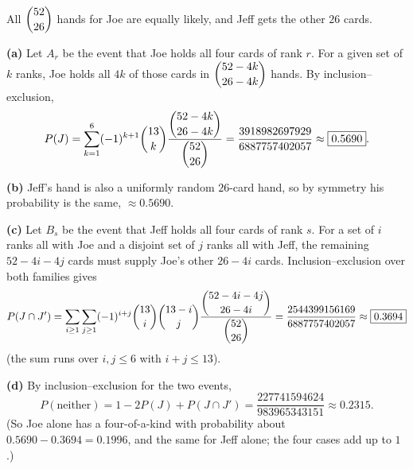 All $\dbinom{52}{26}$ hands for Joe are equally likely, and Jeff gets the other $26$ cards.

\textbf{(a)} Let $A_r$ be the event that Joe holds all four cards of rank $r$. For a given set of $k$ ranks, Joe holds all $4k$ of those cards in $\dbinom{52-4k}{26-4k}$ hands. By inclusion--exclusion,
\[
P(J)=\sum_{k=1}^{6}(-1)^{k+1}\dbinom{13}{k}\dfrac{\dbinom{52-4k}{26-4k}}{\dbinom{52}{26}}=\dfrac{3918982697929}{6887757402057}\approx\boxed{0.5690}.
\]

\textbf{(b)} Jeff's hand is also a uniformly random $26$-card hand, so by symmetry his probability is the same, $\boxed{\approx0.5690}$.

\textbf{(c)} Let $B_s$ be the event that Jeff holds all four cards of rank $s$. For a set of $i$ ranks all with Joe and a disjoint set of $j$ ranks all with Jeff, the remaining $52-4i-4j$ cards must supply Joe's other $26-4i$ cards. Inclusion--exclusion over both families gives
\[
P(J\cap J')=\sum_{i\ge1}\sum_{j\ge1}(-1)^{i+j}\dbinom{13}{i}\dbinom{13-i}{j}\dfrac{\dbinom{52-4i-4j}{26-4i}}{\dbinom{52}{26}}=\dfrac{2544399156169}{6887757402057}\approx\boxed{0.3694}
\]
(the sum runs over $i,j\le6$ with $i+j\le13$).

\textbf{(d)} By inclusion--exclusion for the two events,
\[
P(\text{neither})=1-2P(J)+P(J\cap J')=\dfrac{227741594624}{983965343151}\approx\boxed{0.2315}.
\]
(So Joe alone has a four-of-a-kind with probability about $0.5690-0.3694=0.1996$, and the same for Jeff alone; the four cases add up to $1$.)
